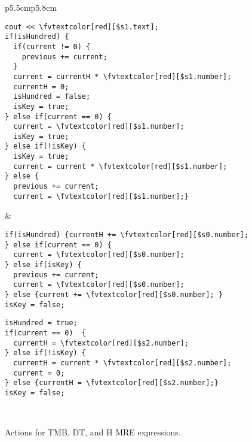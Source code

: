 \newcommand*{\fvtextcolor}[2]{\textcolor{#1}{#2}}
\begin{figure}[tb]
\centering
  \begin{tabular}{p{5.5cm}p{5.8cm}}
\begin{Verbatim}[fontsize=\relsize{-1},frame=single,label=TMB algorithm,commandchars=\\\[\]] 
cout << \fvtextcolor[red][$s1.text];
if(isHundred) {
  if(current != 0) {
    previous += current;
  }
  current = currentH * \fvtextcolor[red][$s1.number];
  currentH = 0;
  isHundred = false;
  isKey = true;
} else if(current == 0) {
  current = \fvtextcolor[red][$s1.number];
  isKey = true;
} else if(!isKey) {
  isKey = true;
  current = current * \fvtextcolor[red][$s1.number];
} else {
  previous += current;
  current = \fvtextcolor[red][$s1.number];}
\end{Verbatim}
&
\begin{Verbatim}[fontsize=\relsize{-1},frame=single,label=DT algorithm,commandchars=\\\[\]] 
if(isHundred) {currentH += \fvtextcolor[red][$s0.number];
} else if(current == 0) {
  current = \fvtextcolor[red][$s0.number];
} else if(isKey) {
  previous += current;
  current = \fvtextcolor[red][$s0.number];
} else {current += \fvtextcolor[red][$s0.number]; }
isKey = false;
\end{Verbatim}
\begin{Verbatim}[fontsize=\relsize{-1},frame=single,label=H algorithm,commandchars=\\\[\]] 
isHundred = true;
if(current == 0)  {
  currentH = \fvtextcolor[red][$s2.number];
} else if(!isKey) {
  currentH = current * \fvtextcolor[red][$s2.number];
  current = 0;
} else {currentH = \fvtextcolor[red][$s2.number];}
isKey = false;
\end{Verbatim}
\\ 
\end{tabular}
 \vspace{-2em}
\caption{Actions for TMB, DT, and H MRE expressions.}
\vspace{-1.5em}
\label{fig:numnormalgo}
\end{figure}


